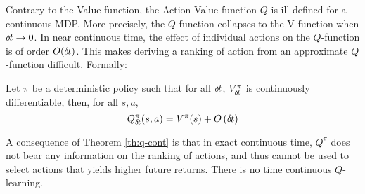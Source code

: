 Contrary to the Value function, the Action-Value function $Q$ is ill-defined
for a continuous MDP. More precisely, the $Q$-function  collapses to the
V-function when ${\delta\hspace{-.1em}t} \rightarrow 0$. In near continuous time, the effect of
individual actions on the $Q$-function is of order $O({\delta\hspace{-.1em}t})$. This makes
deriving a ranking of action from an approximate $Q$-function difficult.
Formally:
\begin{theorem}
Let $\pi$ be a deterministic policy such that for all ${\delta\hspace{-.1em}t}$, $V^\pi_{\delta\hspace{-.1em}t}$ is continuously
differentiable, then, for all $s, a$,
\begin{equation}
	\label{eq:q-discr}
	Q^\pi_{\delta\hspace{-.1em}t}(s, a) = V^\pi(s) + O\left({\delta\hspace{-.1em}t}\right)
\end{equation}

  \label{th:q-cont}
\end{theorem}

A consequence of Theorem \ref{th:q-cont} is that in exact continuous time,
$Q^\pi$ does not bear any information on the ranking of actions, and
thus cannot be used to select actions that yields higher future returns. There is no time continuous $Q$-learning.

